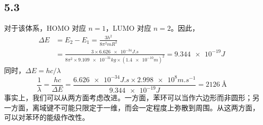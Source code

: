 \subsection{5.3}
对于该体系，HOMO 对应 $n = 1$，LUMO 对应 $n = 2$。因此，
\begin{align}
\Delta E &= E_2 - E_1 = \frac{3 h^2}{8 \pi^2 m R^2} \\&= \frac{3 \times \num{6.626e-34} \si{J.s}}{8 \pi^2 \times \num{9.109e-31} \si{kg} \times (\num{1.4e-10} \si{m})^2} = \num{9.344e-19} \si{J}
\end{align}
同时，$\Delta E = h c / \lambda$
\begin{equation}
\frac1{\lambda} = \frac{h c}{\Delta E} = \frac{\num{6.626e-34} \si{J.s} \times \num{2.998e8} \si{m.s^{-1}}}{\num{9.344e-19} \si{J}} = \SI{2126}{\angstrom}
\end{equation}
事实上，我们可以从两方面考虑改进。一方面，苯环可以当作六边形而非圆形；另一方面，离域键不可能只限定于一维，而会一定程度上弥散到周围。从这两方面，可以对苯环的能级作改性。
